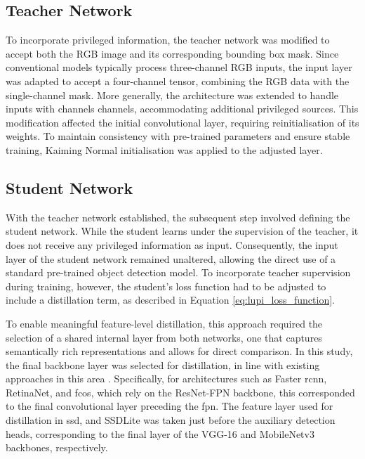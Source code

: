 \subsection{Teacher Network}
\label{subsec:4_teacher}

To incorporate privileged information, the teacher network was modified to accept both the RGB image and its corresponding bounding box mask. Since conventional models typically process three-channel RGB inputs, the input layer was adapted to accept a four-channel tensor, combining the RGB data with the single-channel mask. More generally, the architecture was extended to handle inputs with \gls{channels} channels, accommodating additional privileged sources. This modification affected the initial convolutional layer, requiring reinitialisation of its weights. To maintain consistency with pre-trained parameters and ensure stable training, Kaiming Normal initialisation \cite{kaiming} was applied to the adjusted layer.

\subsection{Student Network}
\label{subsec:4_student}

With the teacher network established, the subsequent step involved defining the student network. While the student learns under the supervision of the teacher, it does not receive any privileged information as input. Consequently, the input layer of the student network remained unaltered, allowing the direct use of a standard pre-trained object detection model. To incorporate teacher supervision during training, however, the student’s loss function had to be adjusted to include a distillation term, as described in Equation \ref{eq:lupi_loss_function}. 

To enable meaningful feature-level distillation, this approach required the selection of a shared internal layer from both networks, one that captures semantically rich representations and allows for direct comparison. In this study, the final backbone layer was selected for distillation, in line with existing approaches in this area \cite{lab2wild, lupi_distillation, distillation2}. Specifically, for architectures such as Faster \gls{rcnn}, RetinaNet, and \gls{fcos}, which rely on the ResNet-FPN backbone, this corresponded to the final convolutional layer preceding the \gls{fpn}. The feature layer used for distillation in \gls{ssd}, and SSDLite was taken just before the auxiliary detection heads, corresponding to the final layer of the VGG-16 and MobileNetv3 backbones, respectively.

